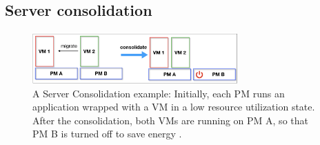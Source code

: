 







\subsection{Server consolidation}
\label{consolidation}

\begin{figure}
	\centering
	\includegraphics[width=0.7\textwidth]{pics/consolidate.png}
	\caption{A Server Consolidation example: Initially, each PM runs an application wrapped with a VM in a low resource utilization state. After the consolidation, both VMs are running on PM A, so that PM B is turned off to save energy \cite{Barroso:2007jt}.}
	\label{fig:consolidation}
\end{figure}


